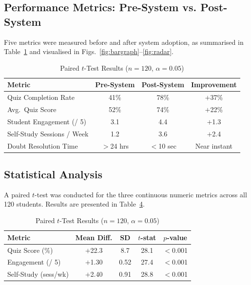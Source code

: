 \documentclass[conference]{IEEEtran}
\begin{document}
\begin{table}[h]
\caption{Evaluation Metric Definitions}
\label{tab:metricdef}
\centering
\subsection{Performance Metrics: Pre-System vs. Post-System}

Five metrics were measured before and after system adoption, as summarised in Table~\ref{tab:metrics} and visualised in Figs.~\ref{fig:bargraph}--\ref{fig:radar}.

\begin{table}[h]
\caption{Performance Metrics: Pre-System vs.\ Post-System ($n = 120$)}
\label{tab:metrics}
\centering
\renewcommand{\arraystretch}{1.3}
\begin{tabular}{|p{2.0cm}|c|c|c|}
\hline
\textbf{Metric} & \textbf{Pre-System} & \textbf{Post-System} & \textbf{Improvement} \\
\hline
Quiz Completion Rate & 41\% & 78\% & $+$37\% \\
\hline
Avg.\ Quiz Score & 52\% & 74\% & $+$22\% \\
\hline
Student Engagement (/ 5) & 3.1 & 4.4 & $+$1.3 \\
\hline
Self-Study Sessions / Week & 1.2 & 3.6 & $+$2.4 \\
\hline
Doubt Resolution Time & $>$24 hrs & $<$10 sec & Near instant \\
\hline
\end{tabular}
\end{table}

\subsection{Statistical Analysis}

A paired $t$-test was conducted for the three continuous numeric metrics across all 120 students. Results are presented in Table~\ref{tab:stats}.

\begin{table}[h]
\caption{Paired $t$-Test Results ($n = 120$, $\alpha = 0.05$)}
\label{tab:stats}
\centering
\renewcommand{\arraystretch}{1.3}
\begin{tabular}{|p{2.2cm}|c|c|c|c|}
\hline
\textbf{Metric} & \textbf{Mean Diff.} & \textbf{SD} & \textbf{$t$-stat} & \textbf{$p$-value} \\
\hline
Quiz Score (\%) & $+$22.3 & 8.7 & 28.1 & $<$0.001 \\
\hline
Engagement (/ 5) & $+$1.30 & 0.52 & 27.4 & $<$0.001 \\
\hline
Self-Study (sess/wk) & $+$2.40 & 0.91 & 28.8 & $<$0.001 \\
\hline
\end{tabular}
\end{table}


\end{table}
\end{document}
